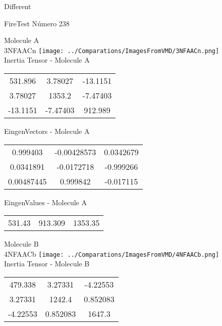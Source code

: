 \begin{center}
\vtab
\vtab
\textcolor{NavyBlue}{\Large Different}
\end{center}

 \newpage

\vtab[-2cm]
\begin{center}
{\large FireTest \tab Número 238}
\end{center}
\begin{multicols}{2}
\begin{center}

Molecule A \\ 
3NFAACn
\texttt{[image: ../Comparations/ImagesFromVMD/3NFAACn.png]}
\\
Inertia Tensor - Molecule A \\
\vtab

\begin{tabular}{|c c c|}
531.896	 & 	3.78027	 & 	-13.1151	 \\
3.78027	 & 	1353.2	 & 	-7.47403	 \\
-13.1151	 & 	-7.47403	 & 	912.989
\end{tabular}

\vtab
 EingenVectors - Molecule A     \\
\vtab
\begin{tabular}{|c c c|}
0.999403	 & 	-0.00428573	 & 	0.0342679	 \\
0.0341891	 & 	-0.0172718	 & 	-0.999266	 \\
0.00487445	 & 	0.999842	 & 	-0.017115
\end{tabular}

\vtab
 EingenValues - Molecule A     \\
\vtab
\begin{tabular}{|c c c|}
531.43	 & 	913.309	 & 	1353.35	 \\
\end{tabular}
\columnbreak

Molecule B \\ 
4NFAACb
\texttt{[image: ../Comparations/ImagesFromVMD/4NFAACb.png]}
\\
Inertia Tensor - Molecule B \\
\vtab

\begin{tabular}{|c c c|}
479.338	 & 	3.27331	 & 	-4.22553	 \\
3.27331	 & 	1242.4	 & 	0.852083	 \\
-4.22553	 & 	0.852083	 & 	1647.3
\end{tabular}


\end{center}
\end{multicols}
